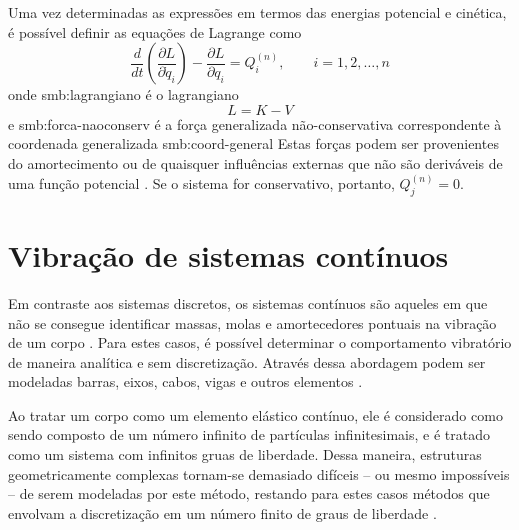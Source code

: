 \documentclass[12pt,openright,oneside,a4paper,
	chapter=TITLE,section=TITLE,
	english,brazil]{abntex2}
\begin{document}
	Uma vez determinadas as expressões em termos das energias potencial e cinética, é possível definir as equações de Lagrange como \cite{savi:2017}
	\begin{equation} \label{eqn:lagrange}
		\frac{d}{dt}\left(\frac{\partial L}{\partial \dot{q}_i}\right) - \frac{\partial L}{\partial q_i} = Q_i^{(n)}, \qquad i = 1, 2, \dots, n
	\end{equation}
	onde \gls{smb:lagrangiano} é o lagrangiano
	\begin{equation}
		L = K-V
	\end{equation}
	e \gls{smb:forca-naoconserv} é a força generalizada não-conservativa correspondente à coordenada generalizada \gls{smb:coord-general} Estas forças podem ser provenientes do amortecimento ou de quaisquer influências externas que não são deriváveis de uma função potencial \cite{rao:2008}. Se o sistema for conservativo, portanto, $ Q_j^{(n)} = 0 $.
	
	\section{Vibração de sistemas contínuos}
	Em contraste aos sistemas discretos, os sistemas contínuos são aqueles em que não se consegue identificar massas, molas e amortecedores pontuais na vibração de um corpo \cite{rao:2008}. Para estes casos, é possível determinar o comportamento vibratório de maneira analítica e sem discretização. Através dessa abordagem podem ser modeladas barras, eixos, cabos, vigas e outros elementos \cite{timoshenko:1974}. 
	
	Ao tratar um corpo como um elemento elástico contínuo, ele é considerado como sendo composto de um número infinito de partículas infinitesimais, e é tratado como um sistema com infinitos gruas de liberdade. Dessa maneira, estruturas geometricamente complexas tornam-se demasiado difíceis -- ou mesmo impossíveis -- de serem modeladas por este método, restando para estes casos métodos que envolvam a discretização em um número finito de graus de liberdade \cite{timoshenko:1974}.
	
\end{document}
